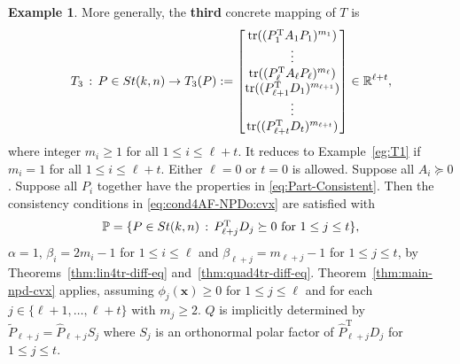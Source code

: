 \documentclass[11pt]{article}
\def\bx{\pmb{x}}
\def\bbP{\mathbb{P}}
\def\bbR{\mathbb{R}}
\def\wtd{\widetilde}
\def\what{\widehat}
\newcommand\STM[2]{{\rm St}(#1,#2)}
\DeclareMathOperator{\tr}{tr}
\DeclareMathOperator{\T}{T}
\theoremstyle{definition}
\newtheorem{example}{Example}[section]
\numberwithin{equation}{section}
\begin{document}
\begin{example}\label{eg:T3}
More generally, the {\bf third} concrete mapping of $T$ is
\begin{equation}\label{eq:T-pow-tr}
T_3\,:\, P\in\STM{k}{n} \to T_3(P):=\begin{bmatrix}
                                        \tr((P_1^{\T}A_1P_1)^{m_1}) \\
                                        \vdots \\
                                        \tr((P_{\ell}^{\T}A_{\ell}P_{\ell})^{m_{\ell}}) \\
                                        \tr((P_{\ell+1}^{\T}D_1)^{m_{\ell+1}}) \\
                                        \vdots \\
                                        \tr((P_{\ell+t}^{\T}D_t)^{m_{\ell+t}}) \\
                                      \end{bmatrix} \in\bbR^{\ell+t},
\end{equation}
where integer $m_i\ge 1$ for all $1\le i\le\ell+t$. It reduces to Example~\ref{eg:T1} if  $m_i=1$ for all $1\le i\le\ell+t$.
Either $\ell=0$ or $t=0$ is allowed. Suppose all $A_i\succeq 0$.
Suppose all $P_i$ together have the properties in \eqref{eq:Part-Consistent}. Then
the consistency conditions in \eqref{eq:cond4AF-NPDo:cvx} are satisfied with
\begin{equation}\label{eq:D-sep}
\bbP=\{P\in\STM{k}{n}\,:\, P_{\ell+j}^{\T}D_j\succeq 0\,\,\mbox{for $1\le j\le t$}\},
\end{equation}
$\alpha=1$, $\beta_i=2m_i-1$ for $1\le i\le\ell$ and $\beta_{\ell+j}=m_{\ell+j}-1$ for $1\le j\le t$, by
Theorems~\ref{thm:lin4tr-diff-eq} and~\ref{thm:quad4tr-diff-eq}.
Theorem~\ref{thm:main-npd-cvx} applies, assuming $\phi_j(\bx)\ge 0$ for $1\le j\le\ell$
and for each $j\in\{\ell+1,\ldots,\ell+t\}$ with $m_j\ge 2$. $Q$ is implicitly determined by
$\wtd P_{\ell+j}=\what P_{\ell+j}S_j$ where $S_j$ is an orthonormal polar factor of
$\what P_{\ell+j}^{\T}D_j$ for $1\le j\le t$.
\end{example}
\end{document}
